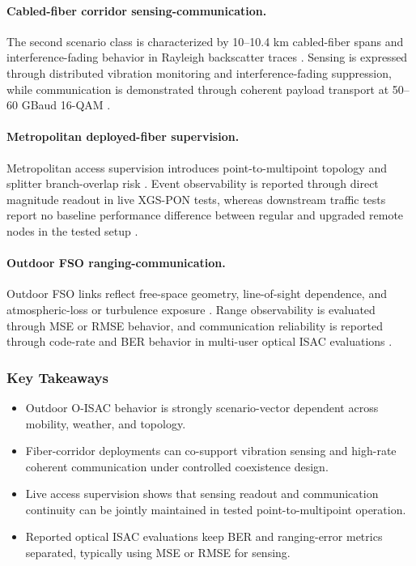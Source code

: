 \paragraph{Cabled-fiber corridor sensing-communication.}
The second scenario class is characterized by 10--10.4 km cabled-fiber spans and interference-fading behavior in Rayleigh backscatter traces \cite{O_ISAC_038,O_ISAC_074}. Sensing is expressed through distributed vibration monitoring and interference-fading suppression, while communication is demonstrated through coherent payload transport at 50--60 GBaud 16-QAM \cite{O_ISAC_038,O_ISAC_074}.

\paragraph{Metropolitan deployed-fiber supervision.}
Metropolitan access supervision introduces point-to-multipoint topology and splitter branch-overlap risk \cite{O_ISAC_064,O_ISAC_276}. Event observability is reported through direct magnitude readout in live XGS-PON tests, whereas downstream traffic tests report no baseline performance difference between regular and upgraded remote nodes in the tested setup \cite{O_ISAC_276}.

\paragraph{Outdoor FSO ranging-communication.}
Outdoor FSO links reflect free-space geometry, line-of-sight dependence, and atmospheric-loss or turbulence exposure \cite{O_ISAC_012,O_ISAC_034}. Range observability is evaluated through MSE or RMSE behavior, and communication reliability is reported through code-rate and BER behavior in multi-user optical ISAC evaluations \cite{O_ISAC_012,O_ISAC_034}.

\subsubsection{Key Takeaways}
\begin{itemize}
\item Outdoor O-ISAC behavior is strongly scenario-vector dependent across mobility, weather, and topology.
\item Fiber-corridor deployments can co-support vibration sensing and high-rate coherent communication under controlled coexistence design.
\item Live access supervision shows that sensing readout and communication continuity can be jointly maintained in tested point-to-multipoint operation.
\item Reported optical ISAC evaluations keep BER and ranging-error metrics separated, typically using MSE or RMSE for sensing.
\end{itemize}


